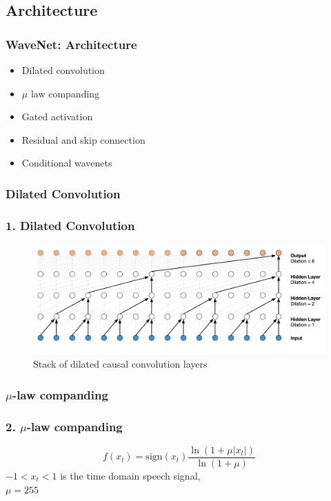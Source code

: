 \documentclass{beamer}
\begin{document}
  \subsection{Architecture}
  \begin{frame}
    \frametitle{WaveNet: Architecture}
      \begin{itemize}
        \item Dilated convolution
        \item $\mu$ law companding
        \item Gated activation
        \item Residual and skip connection
        \item Conditional wavenets
      \end{itemize}
  \end{frame}

  \subsubsection{Dilated Convolution}
  \begin{frame}
    \frametitle{1. Dilated Convolution}
    \begin{figure}
      \includegraphics[scale=0.22]{images/wavenet_arch_dilated_conv.png}
      \caption{Stack of dilated causal convolution layers}
    \end{figure}
  \end{frame}

  \subsubsection{$\mu$-law companding}
  \begin{frame}
    \frametitle{2. $\mu$-law companding}
    \centering
    \begin{equation*}
      f(x_t) = \text{sign}(x_t)\frac{\ln(1 + \mu|x_t|)}{\ln(1 + \mu)}
    \end{equation*}
    $-1 < x_t < 1$ is the time domain speech signal,\\
    $\mu = 255$
  \end{frame}
\end{document}
